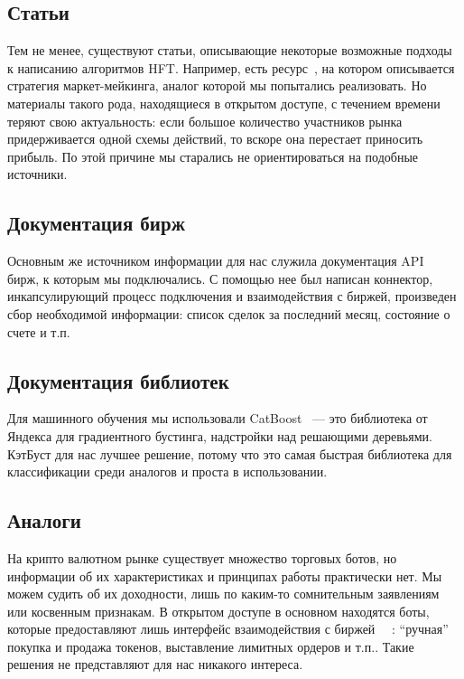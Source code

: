 \subsection{Статьи}
Тем не менее, существуют статьи, описывающие некоторые возможные подходы к написанию алгоритмов HFT. Например, есть ресурс~\cite{HftBattle}, на котором описывается стратегия маркет-мейкинга, аналог которой мы попытались реализовать. Но материалы такого рода, находящиеся в открытом доступе, с течением времени теряют свою актуальность: если большое количество участников рынка придерживается одной схемы действий, то вскоре она перестает приносить прибыль. По этой причине мы старались не ориентироваться на подобные источники.
\subsection{Документация бирж}
Основным же источником информации для нас служила документация API~\cite{DydxDocs}~\cite{BinanceDocs} бирж, к которым мы подключались. С помощью нее был написан коннектор, инкапсулирующий процесс подключения и взаимодействия с биржей, произведен сбор необходимой информации: список сделок за последний месяц, состояние о счете и т.п.
\subsection{Документация библиотек}
Для машинного обучения мы использовали CatBoost~\cite{CatboostDocs} — это библиотека от Яндекса для градиентного бустинга, надстройки над решающими деревьями. КэтБуст для нас лучшее решение, потому что это самая быстрая библиотека для классификации среди аналогов и проста в использовании.

\subsection{Аналоги}
На крипто валютном рынке существует множество торговых ботов, но информации об их характеристиках и принципах работы практически нет. Мы можем судить об их доходности, лишь по каким-то сомнительным заявлениям или косвенным признакам. В открытом доступе в основном находятся боты, которые предоставляют лишь интерфейс взаимодействия с биржей ~\cite{CryptoTradingBot}~\cite{FreqTrade}: “ручная” покупка и продажа токенов, выставление лимитных ордеров и т.п.. Такие решения не представляют для нас никакого интереса.